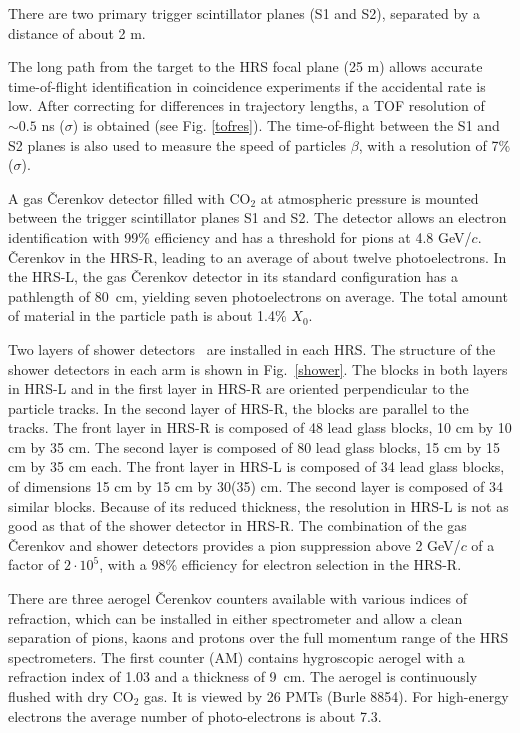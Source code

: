 There are two primary trigger scintillator planes (S1 and S2), 
separated by a distance of about 2 m. 

The long path from the target to the HRS focal plane (25 m) allows 
accurate time-of-flight identification in coincidence experiments 
if the accidental rate is low. 
After correcting for differences in trajectory lengths, 
a TOF resolution of $\sim 0.5$ ns ($\sigma$) is obtained (see Fig. 
\ref{tofres}). The time-of-flight between the S1 and S2 planes is also 
used to measure the speed of particles $\beta$, with a resolution of 7\% ($\sigma$).

A gas \v{C}erenkov detector filled  with CO$_{2}$ at atmospheric 
pressure is mounted between the trigger scintillator planes S1 and S2. 
The detector allows an electron identification  with 99\% efficiency
and has a threshold for pions at 4.8 GeV/$c$. 
\v{C}erenkov in the HRS-R, leading to an average of about twelve photoelectrons. 
In the HRS-L, the gas \v{C}erenkov detector in its standard configuration has 
a pathlength of 80~cm, yielding seven photoelectrons on average. 
The total amount of material in the particle path is about 1.4\% $X_0$. 

Two layers of shower detectors~\cite{shower} are installed in each HRS. 
The structure of the shower detectors in each arm is shown in Fig.~\ref{shower}. 
The blocks in both layers in HRS-L and in the first 
layer in HRS-R are oriented perpendicular to the particle tracks. In 
the second layer of HRS-R, the blocks are parallel to the tracks. The front 
layer in HRS-R is composed of 48 lead glass blocks, 
10 cm by 10 cm by 35 cm. The second layer is composed of 80 
lead glass blocks, 15 cm by 15 cm by 35 cm each.  
The front layer in HRS-L is composed of 34 lead glass blocks, of 
dimensions 15 cm by 15 cm by 30(35) cm. The second layer is  composed 
of 34 similar blocks. Because of its reduced thickness, the resolution in 
HRS-L is not as good as that of the shower detector in HRS-R.
The combination of the gas \v{C}erenkov and shower detectors provides a 
pion suppression above 2 GeV/$c$ of  a factor of $2 \cdot 10^{5}$, with a 
98\% efficiency for electron selection in the HRS-R. 

There are  three aerogel \v{C}erenkov counters available with various indices
of refraction, which can be installed in either spectrometer and allow 
a clean separation of pions, kaons and protons over the full momentum 
range of the HRS spectrometers.
The first counter (AM) contains hygroscopic aerogel  
with a refraction index of 1.03 and a thickness of 9~cm. The 
aerogel is continuously flushed with dry CO$_{2}$ gas.  It is viewed 
by 26 PMTs (Burle 8854). For high-energy electrons the average 
number of photo-electrons is about 7.3. 

